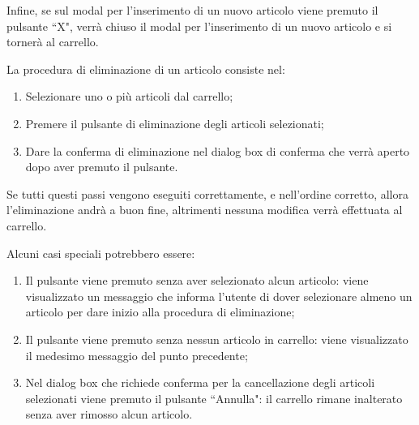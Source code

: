 Infine, se sul modal per l'inserimento di un nuovo articolo viene premuto il pulsante ``X", verrà chiuso il modal per l'inserimento di
un nuovo articolo e si tornerà al carrello.

\newpage

 \label{remove}

La procedura di eliminazione di un articolo consiste nel:
\begin{enumerate}
	\item Selezionare uno o più articoli dal carrello;
	\item Premere il pulsante di eliminazione degli articoli selezionati;
	\item Dare la conferma di eliminazione nel dialog box di conferma che verrà aperto dopo aver premuto il pulsante.
\end{enumerate}

Se tutti questi passi vengono eseguiti correttamente, e nell'ordine corretto, allora l'eliminazione andrà a buon fine, altrimenti nessuna modifica verrà effettuata al carrello.

Alcuni casi speciali potrebbero essere:
\begin{enumerate}
	\item Il pulsante viene premuto senza aver selezionato alcun articolo: viene visualizzato un messaggio che informa l'utente di dover
	selezionare almeno un articolo per dare inizio alla procedura di eliminazione;
	\item Il pulsante viene premuto senza nessun articolo in carrello: viene visualizzato il medesimo messaggio del punto precedente;
	\item Nel dialog box che richiede conferma per la cancellazione degli articoli selezionati viene premuto il pulsante ``Annulla": il
	carrello rimane inalterato senza aver rimosso alcun articolo.
\end{enumerate}

